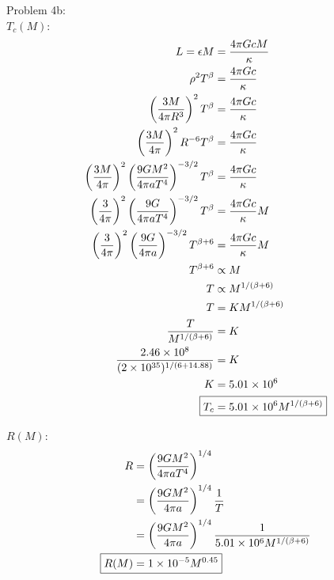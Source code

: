 \documentclass[10pt,letter,preprint]{aastex}
\newcommand{\pt}{\propto}
\newcommand{\rp}{\right)}
\newcommand{\lp}{\left(}
\begin{document}
\newpage
Problem 4b:\\
$T_c(M)$:
\begin{align}
L = \epsilon M &= \frac{4 \pi Gc M}{\kappa}\\
\rho^2 T^\beta &= \frac{4 \pi Gc }{\kappa}\\
\lp \frac{3M}{4 \pi R^3} \rp^2  T^\beta &= \frac{4 \pi Gc }{\kappa}\\
\lp \frac{3M}{4 \pi } \rp^2 R^{-6} T^\beta &= \frac{4 \pi Gc }{\kappa}\\
\lp \frac{3M}{4 \pi } \rp^2\lp \frac{9 GM^2}{4 \pi a T^4} \rp^{-3/2} T^\beta &= \frac{4 \pi Gc }{\kappa}\\
\lp \frac{3}{4 \pi } \rp^2\lp \frac{9 G}{4 \pi a T^4} \rp^{-3/2} T^\beta &= \frac{4 \pi Gc }{\kappa} M \\
\lp \frac{3}{4 \pi } \rp^2\lp \frac{9 G}{4 \pi a } \rp^{-3/2} T^{\beta+6}&= \frac{4 \pi Gc }{\kappa} M \\
T^{\beta + 6} &\pt M\\
T &\pt M^{1/(\beta + 6)}\\
T &= K  M^{1/(\beta + 6)}\\
\frac{T}{ M^{1/(\beta + 6)}} &= K\\
\frac{2.46 \times 10^8}{(2\times 10^{35})^{1/(6+14.88)}}&= K\\
K &= 5.01 \times 10^6\\
\Aboxed{T_c &= 5.01 \times 10^6 M^{1/(\beta + 6)}}
\end{align}

$R(M)$:
\begin{align}
R &= \lp \frac{9 GM^2}{4 \pi aT^4} \rp^{1/4}\\
&=  \lp \frac{9 GM^2}{4 \pi a} \rp^{1/4}\frac{1}{T}\\
&= \lp \frac{9 GM^2}{4 \pi a} \rp^{1/4} \frac{1}{5.01 \times 10^6 M^{1/(\beta + 6)}}\\
\Aboxed{R(M) &= 1 \times 10^{-5} M^{0.45}}
\end{align}


\end{document}

